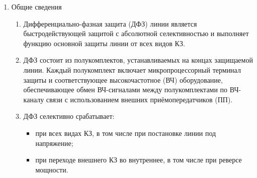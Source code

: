 \color{black}

\begin{enumerate}[label=\arabic{section}.\arabic{subsection}.\arabic{enumi}, labelsep=4pt, leftmargin=0pt, itemindent=57pt, itemsep=0pt, parsep=5pt] %

\item Общие сведения

\begin{enumerate}[label=\arabic{section}.\arabic{subsection}.\arabic{enumi}.\arabic*, labelsep=4pt, leftmargin=0em, itemindent=65pt, parsep=0pt]

\item
Дифференциально-фазная защита (ДФЗ) линии является быстродействующей защитой с абсолютной селективностью и выполняет функцию основной защиты линии от всех видов КЗ.

\item
ДФЗ состоит из полукомплектов, устанавливаемых на концах защищаемой линии. 
Каждый полукомплект включает микропроцессорный терминал защиты и соответствующее высокочастотное (ВЧ) оборудование, обеспечивающее обмен ВЧ-сигналами между полукомплектами по ВЧ-каналу связи с использованием внешних приёмопередатчиков (ПП).

\item 
ДФЗ селективно срабатывает:
\begin{itemize}
    \item при всех видах КЗ, в том числе при постановке линии под напряжение; 
    \item при переходе внешнего КЗ во внутреннее, в том числе при реверсе мощности.
\end{itemize}


\end{enumerate}
\end{enumerate}
